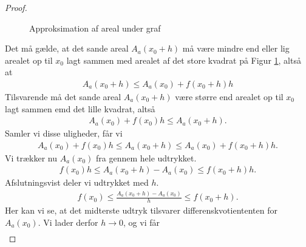 \begin{proof}
\begin{figure}[H]
		\caption{Approksimation af areal under graf}
		\label{fig:bevisareal}
	\end{figure}
	Det må gælde, at det sande areal $A_a(x_0 + h)$ må være mindre end eller lig arealet op til $x_0$ lagt sammen med
	arealet af det store kvadrat på Figur \ref{fig:bevisareal}, altså at
	\begin{align*}
		A_a(x_0 + h) \leq A_a(x_0) + f(x_0 + h)h
	\end{align*}
	Tilsvarende må det sande areal $A_a(x_0 + h)$ være større end arealet op til $x_0$ lagt sammen emd det lille 
	kvadrat, altså
	\begin{align*}
		A_a(x_0) + f(x_0)h \leq A_a(x_0 + h).
	\end{align*}
	Samler vi disse uligheder, får vi
	\begin{align*}
		A_a(x_0) + f(x_0)h \leq A_a(x_0 + h) \leq A_a(x_0) + f(x_0 + h)h.
	\end{align*}
	Vi trækker nu $A_a(x_0)$ fra gennem hele udtrykket.
	\begin{align*}
		f(x_0)h \leq A_a(x_0 + h) - A_a(x_0) \leq f(x_0 + h)h.
	\end{align*}
	Afslutningsvist deler vi udtrykket med $h$.
	\begin{align*}
		f(x_0) \leq \frac{A_a(x_0 + h) - A_a(x_0)}{h} \leq f(x_0 + h).
	\end{align*}
	Her kan vi se, at det midterste udtryk tilsvarer differenskvotiententen for $A_a(x_0)$. Vi lader derfor $h \to 0$, 
	og vi får 
	\begin{align*}

\end{align*}
\end{proof}
